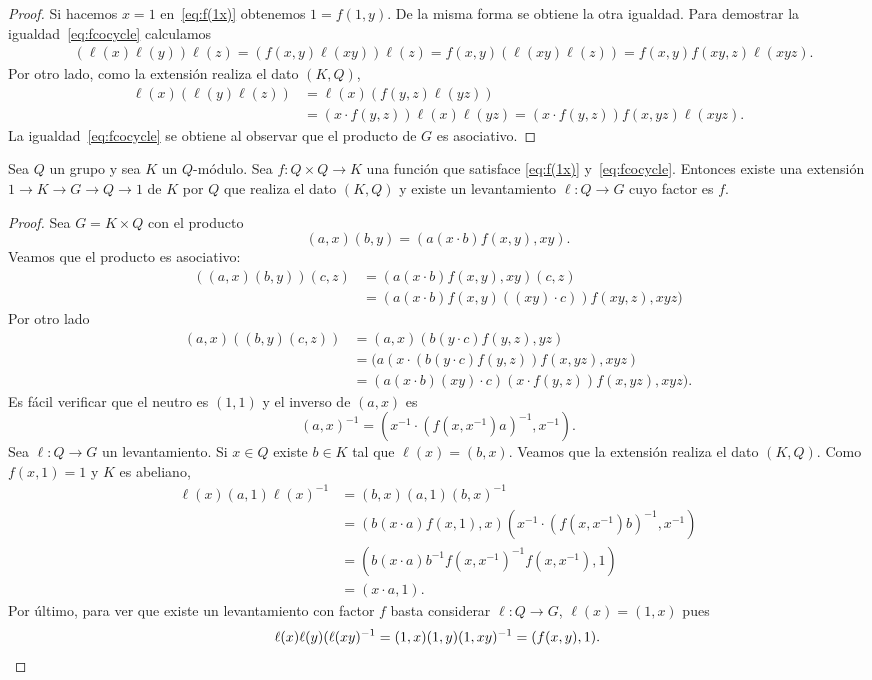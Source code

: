 \begin{proof}
	Si hacemos $x=1$ en~\eqref{eq:f(1x)} obtenemos $1=f(1,y)$. De la misma
	forma se obtiene la otra igualdad. Para demostrar la
	igualdad~\eqref{eq:fcocycle} calculamos 
	\begin{align*}
		&(\ell(x)\ell(y))\ell(z)=(f(x,y)\ell(xy))\ell(z)
		=f(x,y)(\ell(xy)\ell(z))
		=f(x,y)f(xy,z)\ell(xyz).
	\end{align*}
	Por otro lado, como 
	la extensión realiza el dato $(K,Q)$, 
	\begin{align*}
		\ell(x)(\ell(y)\ell(z))&=\ell(x)(f(y,z)\ell(yz))\\
		&=(x\cdot f(y,z))\ell(x)\ell(yz)=(x\cdot f(y,z))f(x,yz)\ell(xyz).
	\end{align*}
	La igualdad~\eqref{eq:fcocycle} se obtiene al observar que el producto de
	$G$ es asociativo.
\end{proof}

\begin{lemma}
	\label{lemma:G(K,Q,f)}
	Sea $Q$ un grupo y sea $K$ un $Q$-módulo. Sea $f\colon Q\times Q\to K$ una
	función que satisface \eqref{eq:f(1x)} y~\eqref{eq:fcocycle}. Entonces
	existe una extensión $1\to K\to G\to Q\to 1$ de $K$ por $Q$ que realiza el
	dato $(K,Q)$ y existe un levantamiento $\ell\colon Q\to G$ cuyo factor es
	$f$.
\end{lemma}

\begin{proof}
	Sea $G=K\times Q$ con el producto
	\[
		(a,x)(b,y)=(a(x\cdot b)f(x,y),xy).
	\]
	Veamos que el producto es asociativo:
	\begin{align*}
		((a,x)(b,y))(c,z)&=(a(x\cdot b)f(x,y),xy)(c,z)\\
		&=(a(x\cdot b)f(x,y)((xy)\cdot c))f(xy,z),xyz)
	\end{align*}
	Por otro lado
	\begin{align*}
		(a,x)((b,y)(c,z)) &= (a,x)(b(y\cdot c)f(y,z),yz)\\
		&=(a(x\cdot (b(y\cdot c)f(y,z))f(x,yz),xyz)\\
		&=(a(x\cdot b)(xy)\cdot c)(x\cdot f(y,z))f(x,yz),xyz).
	\end{align*}
	Es fácil verificar que el neutro es $(1,1)$ y el inverso de $(a,x)$ es 
	\[
	(a,x)^{-1}=(x^{-1}\cdot (f(x,x^{-1})a)^{-1},x^{-1}).
	\]
	Sea $\ell\colon Q\to G$ un levantamiento. Si $x\in Q$ existe $b\in K$ tal
	que $\ell(x)=(b,x)$. Veamos que la extensión realiza el dato $(K,Q)$. Como
	$f(x,1)=1$ y $K$ es abeliano, 
	\begin{align*}
		\ell(x)(a,1)\ell(x)^{-1}
		&=(b,x)(a,1)(b,x)^{-1}\\
		&=(b(x\cdot a)f(x,1),x)(x^{-1}\cdot (f(x,x^{-1})b)^{-1},x^{-1})\\
		&=(b(x\cdot a)b^{-1}f(x,x^{-1})^{-1}f(x,x^{-1}),1)\\
		&=(x\cdot a,1).
	\end{align*}
	Por último, para ver que existe un levantamiento con factor $f$ basta
	considerar $\ell\colon Q\to G$, $\ell(x)=(1,x)$ pues 
	\[
		\ell(x)\ell(y)(\ell(xy)^{-1}=(1,x)(1,y)(1,xy)^{-1}=(f(x,y),1).\qedhere
	\]
\end{proof}

